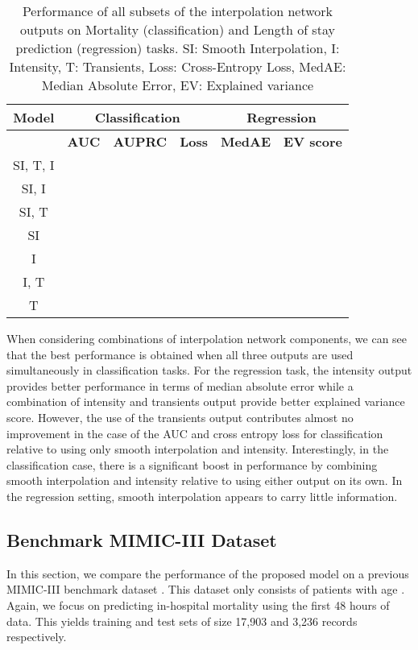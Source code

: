 \documentclass{article} \usepackage{iclr2019_conference,times}
\begin{document}
\begin{table}[h]
\caption{Performance of all subsets of the interpolation network outputs
on Mortality (classification) and Length of stay prediction (regression) tasks. SI: Smooth Interpolation, I: Intensity, T: Transients, Loss: Cross-Entropy Loss, MedAE: Median Absolute Error, EV: Explained variance }
\footnotesize
\begin{center}

\begin{tabular}{ c c c c c c} 
 \toprule
 {\bf Model}&  \multicolumn{3}{c}{\bf Classification} &  \multicolumn{2}{c}{\bf Regression}\\
 \midrule
 {} & {\bf AUC} & {\bf AUPRC} & {\bf Loss} & {\bf MedAE} & {\bf EV score}\\
 \midrule
 SI, T, I &  & &   &  &  \\
 SI, I &  &  &   &  &  \\
  SI, T &  & &  &  & \\
 SI &  &&  &  &	\\	 
I &  & & 	 &   & 	\\	
 I, T &  & &	 &  & \\	
 T &  & &	 &  &	 \\
  \bottomrule
 \end{tabular}
\end{center}

\label{table:analysis}
\end{table}


When considering combinations of interpolation network components, we can
see that the best performance is obtained when all three outputs are
used simultaneously in classification tasks.  For the regression task, the 
intensity output provides better performance in terms of median absolute 
error while a combination of intensity and transients output provide better explained variance score.
However, the use of the transients output contributes almost
no improvement in the case of the AUC and cross entropy loss for classification
relative to using only smooth interpolation and intensity. Interestingly,
in the classification case, there is a significant boost in performance 
by combining smooth interpolation and intensity relative to using either 
output on its own. In the regression setting, smooth interpolation appears
to carry little information. 

\subsection{Benchmark MIMIC-III Dataset}
\label{benchmark}
In this section, we compare the performance of the proposed model on a previous MIMIC-III benchmark dataset \citep{benchmark}. This dataset only consists of patients with age . Again, we focus on predicting in-hospital mortality using the first 48 hours of data. This yields training and test sets of size 17,903 and 3,236 records respectively. 
\end{document}
